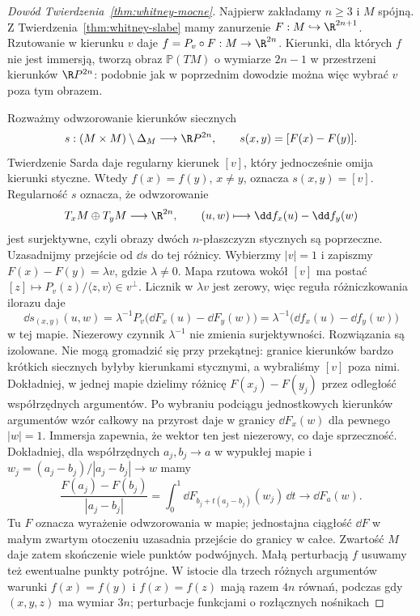 \begin{proof}[Dowód Twierdzenia~\ref{thm:whitney-mocne}]
Najpierw zakładamy $n\geq3$ i $M$ spójną.
Z Twierdzenia~\ref{thm:whitney-slabe}
mamy zanurzenie $F:M\hookrightarrow\R^{2n+1}$.
Rzutowanie w kierunku $v$ daje
$f=P_v\circ F:M\to\R^{2n}$. Kierunki,
dla których $f$ nie jest immersją,
tworzą obraz $\mathbb P(TM)$ o wymiarze
$2n-1$ w przestrzeni kierunków
$\R P^{2n}$: podobnie jak w poprzednim
dowodzie można więc wybrać $v$ poza
tym obrazem.

Rozważmy odwzorowanie kierunków siecznych
\[
 s:(M\times M)\setminus\Delta_M
   \longrightarrow\R P^{2n},\qquad
 s(x,y)=[F(x)-F(y)].
\]
Twierdzenie Sarda daje regularny kierunek
$[v]$, który jednocześnie omija
kierunki styczne. Wtedy
$f(x)=f(y)$, $x\ne y$, oznacza
$s(x,y)=[v]$. Regularność $s$
oznacza, że odwzorowanie
\[
 T_xM\oplus T_yM\longrightarrow\R^{2n},
 \qquad (u,w)\longmapsto
   \dd f_x(u)-\dd f_y(w)
\]
jest surjektywne, czyli obrazy dwóch
$n$-płaszczyzn stycznych są poprzeczne.
Uzasadnijmy przejście od $\dd s$ do tej różnicy.
Wybierzmy $|v|=1$ i zapiszmy $F(x)-F(y)=\lambda v$,
gdzie $\lambda\ne0$.
Mapa rzutowa wokół $[v]$ ma postać
$[z]\mapsto P_v(z)/\langle z,v\rangle\in v^\perp$.
Licznik w $\lambda v$ jest zerowy, więc reguła
różniczkowania ilorazu daje
\[
 \dd s_{(x,y)}(u,w)
 =\lambda^{-1}P_v\bigl(\dd F_x(u)-\dd F_y(w)\bigr)
 =\lambda^{-1}\bigl(\dd f_x(u)-\dd f_y(w)\bigr)
\]
w tej mapie. Niezerowy czynnik $\lambda^{-1}$
nie zmienia surjektywności.
Rozwiązania są izolowane. Nie mogą
gromadzić się przy przekątnej:
granice kierunków bardzo krótkich
siecznych byłyby kierunkami stycznymi,
a wybraliśmy $[v]$ poza nimi. Dokładniej, w jednej
mapie dzielimy różnicę $F(x_j)-F(y_j)$ przez
odległość współrzędnych argumentów. Po wybraniu
podciągu jednostkowych kierunków argumentów wzór
całkowy na przyrost daje w granicy $\dd F_x(w)$
dla pewnego $|w|=1$. Immersja zapewnia, że wektor
ten jest niezerowy, co daje sprzeczność.
Dokładniej, dla współrzędnych $a_j,b_j\to a$ w wypukłej
mapie i $w_j=(a_j-b_j)/|a_j-b_j|\to w$ mamy
\[
 \frac{F(a_j)-F(b_j)}{|a_j-b_j|}
 =\int_0^1 \dd F_{b_j+t(a_j-b_j)}(w_j)\,\dd t
 \longrightarrow\dd F_a(w).
\]
Tu $F$ oznacza wyrażenie odwzorowania w mapie;
jednostajna ciągłość $\dd F$ w małym zwartym otoczeniu
uzasadnia przejście do granicy w całce.
Zwartość $M$ daje zatem skończenie
wiele punktów podwójnych.
Małą perturbacją $f$ usuwamy też
ewentualne punkty potrójne.
W istocie dla trzech różnych argumentów
warunki $f(x)=f(y)$ i $f(x)=f(z)$
mają razem $4n$ równań, podczas gdy
$(x,y,z)$ ma wymiar $3n$; perturbacje
funkcjami o rozłącznych nośnikach

\end{proof}
